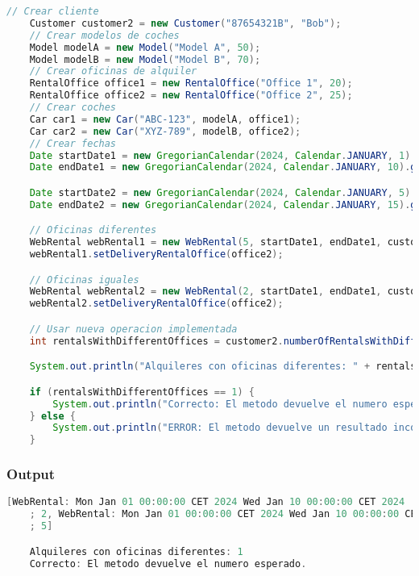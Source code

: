 \begin{lstlisting}[style = javaNormal, language=Java] 
    // Crear cliente
    Customer customer2 = new Customer("87654321B", "Bob");
    // Crear modelos de coches
    Model modelA = new Model("Model A", 50);
    Model modelB = new Model("Model B", 70);
    // Crear oficinas de alquiler
    RentalOffice office1 = new RentalOffice("Office 1", 20);
    RentalOffice office2 = new RentalOffice("Office 2", 25);
    // Crear coches
    Car car1 = new Car("ABC-123", modelA, office1);
    Car car2 = new Car("XYZ-789", modelB, office2);
    // Crear fechas
    Date startDate1 = new GregorianCalendar(2024, Calendar.JANUARY, 1).getTime();
    Date endDate1 = new GregorianCalendar(2024, Calendar.JANUARY, 10).getTime();

    Date startDate2 = new GregorianCalendar(2024, Calendar.JANUARY, 5).getTime();
    Date endDate2 = new GregorianCalendar(2024, Calendar.JANUARY, 15).getTime();

    // Oficinas diferentes
    WebRental webRental1 = new WebRental(5, startDate1, endDate1, customer2, car1, office1);
    webRental1.setDeliveryRentalOffice(office2);

    // Oficinas iguales
    WebRental webRental2 = new WebRental(2, startDate1, endDate1, customer2, car2, office2);
    webRental2.setDeliveryRentalOffice(office2);

    // Usar nueva operacion implementada
    int rentalsWithDifferentOffices = customer2.numberOfRentalsWithDifferentOffices();

    System.out.println("Alquileres con oficinas diferentes: " + rentalsWithDifferentOffices);

    if (rentalsWithDifferentOffices == 1) {
        System.out.println("Correcto: El metodo devuelve el numero esperado.");
    } else {
        System.out.println("ERROR: El metodo devuelve un resultado incorrecto.");
    }
\end{lstlisting}


\subsubsection*{Output}

\begin{lstlisting}[style = javaNormal, language=Java] 
    [WebRental: Mon Jan 01 00:00:00 CET 2024 Wed Jan 10 00:00:00 CET 2024
    ; 2, WebRental: Mon Jan 01 00:00:00 CET 2024 Wed Jan 10 00:00:00 CET 2024
    ; 5]

    Alquileres con oficinas diferentes: 1
    Correcto: El metodo devuelve el numero esperado.
\end{lstlisting}

